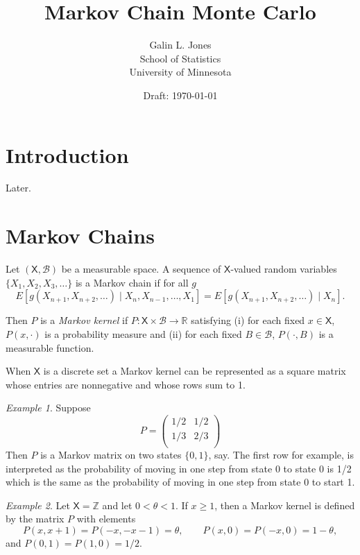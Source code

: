 \documentclass[12pt]{article}
\title{Markov Chain Monte Carlo}
\author{Galin L. Jones\\
{\small School of Statistics}\\
{\small University of Minnesota}}
\date{Draft: \today}
\theoremstyle{plain}
\theoremstyle{definition}
\theoremstyle{remark}
\newtheorem{example}{Example}[section]
\newcommand{\X}{\mathsf{X}}
\newcommand{\real}{\mathbb{R}}
\begin{document}
\maketitle

\tableofcontents

\section{Introduction}
\label{mcmc:sec:intro}

Later.

\section{Markov Chains}
\label{mcmc:sec:markov}

Let $(\X, \mathcal{B})$ be a measurable space.  A sequence of
$\X$-valued random variables $\{X_1, X_2, X_3, \ldots \}$ is a Markov
chain if for all $g$
\[
E\left[ g(X_{n+1}, X_{n+2}, \ldots) \mid X_n, X_{n-1}, \ldots, X_1
\right] = E\left[ g(X_{n+1}, X_{n+2}, \ldots) \mid X_n\right].
\]

Then $P$ is a {\em Markov kernel}
if $P : \X \times \mathcal{B} \to \real$ satisfying (i) for each fixed
$x \in \X$, $P(x, \cdot)$ is a probability measure and (ii) for each fixed
$B \in \mathcal{B}$, $P(\cdot, B)$ is a measurable function.  

When $\X$ is a discrete set a Markov kernel can be represented as a
square matrix whose entries are nonnegative and whose rows sum to 1.

\begin{example}
  Suppose
  \[
    P= \begin{pmatrix}
      1/2 & 1/2 \\
      1/3 & 2/3\\
      \end{pmatrix}
  \]
  Then $P$ is  a Markov matrix on two states $\{0, 1\}$, say.  The
  first row for example, is interpreted as
  the probability of moving in one step from state 0 to state 0 is 1/2
  which is the same as the probability of moving in one step from state 0 to start 1.
 \end{example}

\begin{example}
  Let $\X=\mathbb{Z}$ and let $0 < \theta < 1$.  If $x \ge 1$, then a
  Markov kernel is defined by the matrix $P$ with elements
  \[
    P(x, x+1) = P(-x, -x-1) = \theta, \quad \quad P(x,0)=P(-x,0) = 1- \theta,
  \]
  and $P(0,1)=P(1,0) =1/2$.
\end{example}
\end{document}
